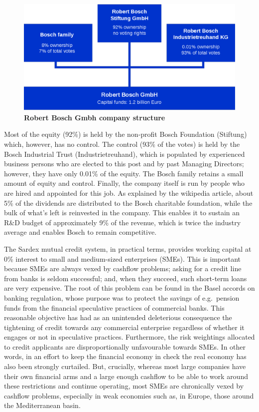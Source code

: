 \begin{figure}[h]
\centering
\includegraphics[width=12 cm]{Figures/Bosch}
\caption{\bf \small Robert Bosch Gmbh company structure}
\label{fig:bosch}
\end{figure}

Most of the equity (92\%) is held by the non-profit Bosch Foundation (Stiftung) which, however, has no control. The control (93\% of the votes) is held by the Bosch Industrial Trust (Industrietreuhand), which is populated by experienced business persons who are elected to this post and by past Managing Directors; however, they have only 0.01\% of the equity. The Bosch family retains a small amount of equity and control. Finally, the company itself is run by people who are hired and appointed for this job. As explained by the wikipedia article, about 5\% of the dividends are distributed to the Bosch charitable foundation, while the bulk of what's left is reinvested in the company. This enables it to sustain an R\&D budget of approximately 9\% of the revenue, which is twice the industry average and enables Bosch to remain competitive.

The Sardex mutual credit system, in practical terms, provides working capital at 0\% interest to small and medium-sized enterprises (SMEs). This is important because SMEs are always vexed by cashflow problems; asking for a credit line from banks is seldom successful; and, when they succeed, such short-term loans are very expensive. The root of this problem can be found in the Basel accords on banking regulation, whose purpose was to protect the savings of e.g.\ pension funds from the financial speculative practices of commercial banks. This reasonable objective has had as an unintended deleterious consequence the tightening of credit towards any commercial enterprise regardless of whether it engages or not in speculative practices. Furthermore, the risk weightings allocated to credit applicants are disproportionally unfavourable towards SMEs. In other words, in an effort to keep the financial economy in check the real economy has also been strongly curtailed. But, crucially, whereas most large companies have their own financial arms and a large enough cashflow to be able to work around these restrictions and continue operating, most SMEs are chronically vexed by cashflow problems, especially in weak economies such as, in Europe, those around the Mediterranean basin.

